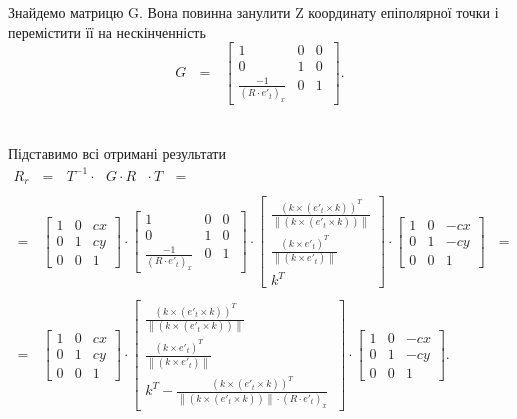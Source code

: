 \\\\
Знайдемо матрицю G. Вона повинна занулити Z координату епіполярної
точки і перемістити її на нескінченність
\begin{equation}
G \:\:\: = \:\:\:\left[
\begin{matrix}
1 & 0 & 0\\
0 & 1 & 0\\
\frac{-1}{{(R \cdot {e'}_t)}_x} & 0 & 1\
\end{matrix}
\right].
\end{equation}
\\\\
Підставимо всі отримані результати
\begin{equation}
\begin{array}{l}
R_r  \:\:\: = \:\:\: T^{-1} \cdot \:\:\: G \cdot R \:\:\: \cdot T \:\:\: = 
\\\\
= \:\:\:
\left[
\begin{matrix}
1 & 0 & cx\\
0 & 1 & cy\\
0 & 0 & 1\
\end{matrix}
\right]
\cdot
\left[
\begin{matrix}
1 & 0 & 0\\
0 & 1 & 0\\
\frac{-1}{{(R \cdot {e'}_t)}_x} & 0 & 1\
\end{matrix}
\right]
\cdot
\left[
\begin{matrix}
\frac{{(k \times ({e'}_t \times k))}^T} 
{\left \| (k \times ({e'}_t \times k)) \right \|}\\
\frac{{(k \times {e'}_t)}^T}{\left \| (k \times {e'}_t) \right \|}\\
k^T\
\end{matrix}
\right]
\cdot
\left[
\begin{matrix}
1 & 0 & -cx\\
0 & 1 & -cy\\
0 & 0 & 1\
\end{matrix}
\right] \:\:\: =
\\\\
= \:\:\:
\left[
\begin{matrix}
1 & 0 & cx\\
0 & 1 & cy\\
0 & 0 & 1\
\end{matrix}
\right]
\cdot
\left[
\begin{matrix}
\frac{{(k \times ({e'}_t \times k))}^T} 
{\left \| (k \times ({e'}_t \times k)) \right \|}\\
\frac{{(k \times {e'}_t)}^T}{\left \| (k \times {e'}_t) \right \|}\\
k^T-\frac{{(k \times ({e'}_t \times k))}^T} 
{\left \| (k \times ({e'}_t \times k)) \right \| \cdot {(R \cdot {e'}_t)}_x}\
\end{matrix}
\right]
\cdot
\left[
\begin{matrix}
1 & 0 & -cx\\
0 & 1 & -cy\\
0 & 0 & 1\
\end{matrix}
\right].
\end{array}
\end{equation}
